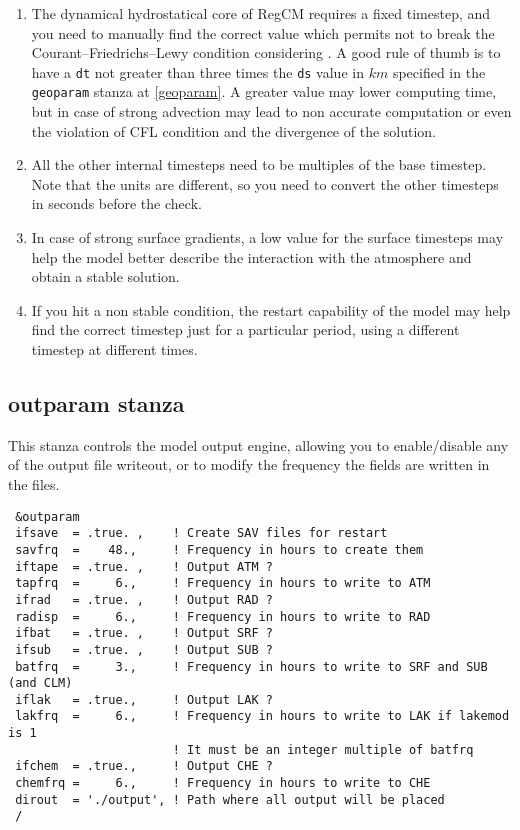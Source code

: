 \begin{enumerate}
\item The dynamical hydrostatical core of RegCM requires a fixed timestep,
and you need to manually find the correct value which permits not to break
the Courant–Friedrichs–Lewy condition considering \cite{CFL}. A good rule
of thumb is to have a \verb=dt= not greater than three times the \verb=ds=
value in $km$ specified in the \verb=geoparam= stanza at \ref{geoparam}.
A greater value may lower computing time, but in case of strong advection
may lead to non accurate computation or even the violation of CFL condition
and the divergence of the solution.
\item All the other internal timesteps need to be multiples of the base timestep.
Note that the units are different, so you need to convert the other timesteps
in seconds before the check.
\item In case of strong surface gradients, a low value for the surface timesteps
may help the model better describe the interaction with the atmosphere and
obtain a stable solution.
\item If you hit a non stable condition, the restart capability of the model
may help find the correct timestep just for a particular period, using a
different timestep at different times.
\end{enumerate}

\subsection{outparam stanza}

This stanza controls the model output engine, allowing you to enable/disable
any of the output file writeout, or to modify the frequency the fields are
written in the files.

{\footnotesize
\begin{Verbatim}
 &outparam
 ifsave  = .true. ,    ! Create SAV files for restart
 savfrq  =    48.,     ! Frequency in hours to create them
 iftape  = .true. ,    ! Output ATM ?
 tapfrq  =     6.,     ! Frequency in hours to write to ATM
 ifrad   = .true. ,    ! Output RAD ?
 radisp  =     6.,     ! Frequency in hours to write to RAD
 ifbat   = .true. ,    ! Output SRF ?
 ifsub   = .true. ,    ! Output SUB ?
 batfrq  =     3.,     ! Frequency in hours to write to SRF and SUB (and CLM)
 iflak   = .true.,     ! Output LAK ?
 lakfrq  =     6.,     ! Frequency in hours to write to LAK if lakemod is 1
                       ! It must be an integer multiple of batfrq
 ifchem  = .true.,     ! Output CHE ?
 chemfrq =     6.,     ! Frequency in hours to write to CHE
 dirout  = './output', ! Path where all output will be placed
 /
\end{Verbatim}
}

